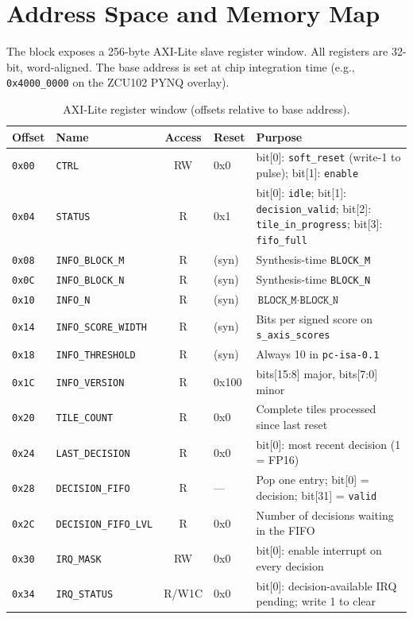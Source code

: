 \documentclass[11pt]{article}
\begin{document}
\section{Address Space and Memory Map}
\label{sec:memmap}

The block exposes a 256-byte AXI-Lite slave register window. All registers
are 32-bit, word-aligned. The base address is set at chip integration time
(e.g., \texttt{0x4000\_0000} on the ZCU102 PYNQ overlay).

\begin{table}[h]
\centering
\small
\caption{AXI-Lite register window (offsets relative to base address).}
\label{tab:regs}
\begin{tabular}{@{}l l c l p{6.8cm}@{}}
\toprule
Offset & Name & Access & Reset & Purpose \\
\midrule
\texttt{0x00} & \texttt{CTRL}              & RW    & 0x0   & bit[0]: \texttt{soft\_reset} (write-1 to pulse); bit[1]: \texttt{enable} \\
\texttt{0x04} & \texttt{STATUS}            & R     & 0x1   & bit[0]: \texttt{idle}; bit[1]: \texttt{decision\_valid}; bit[2]: \texttt{tile\_in\_progress}; bit[3]: \texttt{fifo\_full} \\
\texttt{0x08} & \texttt{INFO\_BLOCK\_M}    & R     & (syn) & Synthesis-time \texttt{BLOCK\_M} \\
\texttt{0x0C} & \texttt{INFO\_BLOCK\_N}    & R     & (syn) & Synthesis-time \texttt{BLOCK\_N} \\
\texttt{0x10} & \texttt{INFO\_N}           & R     & (syn) & $\texttt{BLOCK\_M} \cdot \texttt{BLOCK\_N}$ \\
\texttt{0x14} & \texttt{INFO\_SCORE\_WIDTH}& R     & (syn) & Bits per signed score on \texttt{s\_axis\_scores} \\
\texttt{0x18} & \texttt{INFO\_THRESHOLD}   & R     & (syn) & Always 10 in \texttt{pc-isa-0.1} \\
\texttt{0x1C} & \texttt{INFO\_VERSION}     & R     & 0x100 & bits[15:8] major, bits[7:0] minor \\
\texttt{0x20} & \texttt{TILE\_COUNT}       & R     & 0x0   & Complete tiles processed since last reset \\
\texttt{0x24} & \texttt{LAST\_DECISION}    & R     & 0x0   & bit[0]: most recent decision (1 = FP16) \\
\texttt{0x28} & \texttt{DECISION\_FIFO}    & R     & ---   & Pop one entry; bit[0] = decision; bit[31] = \texttt{valid} \\
\texttt{0x2C} & \texttt{DECISION\_FIFO\_LVL}& R    & 0x0   & Number of decisions waiting in the FIFO \\
\texttt{0x30} & \texttt{IRQ\_MASK}         & RW    & 0x0   & bit[0]: enable interrupt on every decision \\
\texttt{0x34} & \texttt{IRQ\_STATUS}       & R/W1C & 0x0   & bit[0]: decision-available IRQ pending; write 1 to clear \\
\bottomrule
\end{tabular}
\end{table}
\end{document}
